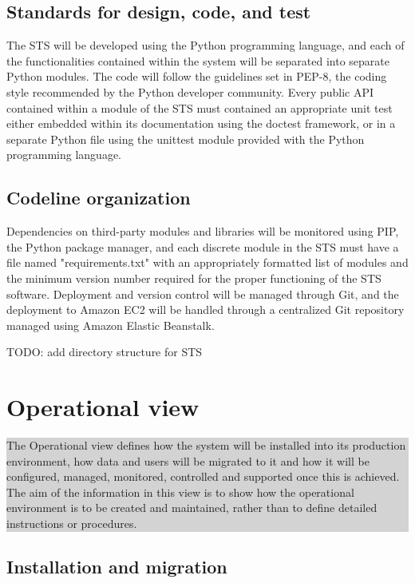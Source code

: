 \documentclass[a4paper,11pt]{report}
\newcommand{\instructions}[1]{
  \noindent\colorbox{lightgray}{%
    \parbox{\linewidth}{%
      #1
    }%
  }%
 \vspace{0.1cm}
}
\begin{document}
\subsection{Standards for design, code, and test}
\label{sec:stand-design-code}

The STS will be developed using the Python programming language, and each of
the functionalities contained within the system will be separated into separate
Python modules. The code will follow the guidelines set in PEP-8, the coding
style recommended by the Python developer community. Every public API contained
within a module of the STS must contained an appropriate unit test either
embedded within its documentation using the doctest framework, or in a separate
Python file using the unittest module provided with the Python programming
language.

\subsection{Codeline organization}
\label{sec:codel-organ}

Dependencies on third-party modules and libraries will be monitored using PIP,
the Python package manager, and each discrete module in the STS must have a
file named "requirements.txt" with an appropriately formatted list of modules
and the minimum version number required for the proper functioning of the STS
software. Deployment and version control will be managed through Git, and the
deployment to Amazon EC2 will be handled through a centralized Git repository
managed using Amazon Elastic Beanstalk.

TODO: add directory structure for STS

\section{Operational view}
\label{sec:operational-view}

\instructions{
The Operational view defines how the system will be installed into its
production environment, how data and users will be migrated to it and
how it will be configured, managed, monitored, controlled and
supported once this is achieved. The aim of the information in this
view is to show how the operational environment is to be created and
maintained, rather than to define detailed instructions or procedures.
}
\subsection{Installation and migration}
\label{sec:inst-migr}
\end{document}
